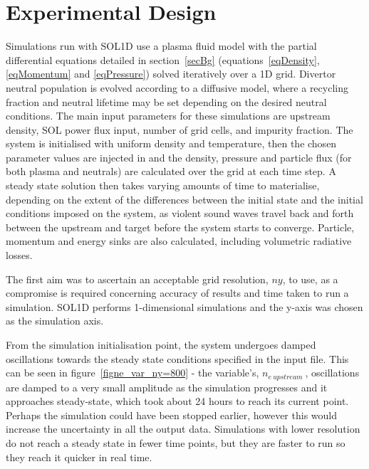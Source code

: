 \documentclass[12pt]{article}  %
\providecommand{\neupstream}{$n_{e~upstream}~$} %
\begin{document}
\section{Experimental Design}\label{secExpt}
Simulations run with SOL1D use a plasma fluid model with the partial differential equations detailed in section~\ref{secBg} (equations~\ref{eqDensity}, \ref{eqMomentum} and \ref{eqPressure}) solved iteratively over a 1D grid. Divertor neutral population is evolved according to a diffusive model, where a recycling fraction and neutral lifetime may be set depending on the desired neutral conditions. The main input parameters for these simulations are upstream density, SOL power flux input, number of grid cells, and impurity fraction. The system is initialised with uniform density and temperature, then the chosen parameter values are injected in and the density, pressure and particle flux (for both plasma and neutrals) are calculated over the grid at each time step. A steady state solution then takes varying amounts of time to materialise, depending on the extent of the differences between the initial state and the initial conditions imposed on the system, as violent sound waves travel back and forth between the upstream and target before the system starts to converge. Particle, momentum and energy sinks are also calculated, including volumetric radiative losses.

The first aim was to ascertain an acceptable grid resolution, $ny$, to use, as a compromise is required concerning accuracy of results and time taken to run a simulation. SOL1D performs 1-dimensional simulations and the y-axis was chosen as the simulation axis. 

From the simulation initialisation point, the system undergoes damped oscillations towards the steady state conditions specified in the input file. This can be seen in figure~\ref{figne_var_ny=800} - the variable's, \neupstream, oscillations are damped to a very small amplitude as the simulation progresses and it approaches steady-state, which took about 24 hours to reach its current point. Perhaps the simulation could have been stopped earlier, however this would increase the uncertainty in all the output data. Simulations with lower resolution do not reach a steady state in fewer time points, but they are faster to run so they reach it quicker in real time.
\end{document}
